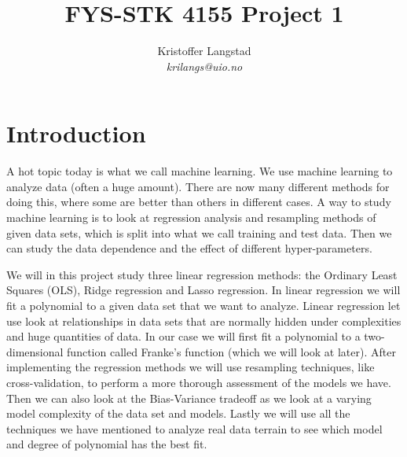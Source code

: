 \documentclass[12pt,a4paper,english]{article}
\title{FYS-STK 4155 Project 1}
\date{}
\author{ Kristoffer Langstad\\ \textit{krilangs@uio.no}}
\begin{document}
\maketitle
\begin{abstract}
	
\end{abstract}

\section{Introduction}
A hot topic today is what we call machine learning. We use machine learning to analyze data (often a huge amount). There are now many different methods for doing this, where some are better than others in different cases. A way to study machine learning is to look at regression analysis and resampling methods of given data sets, which is split into what we call training and test data. Then we can study the data dependence and the effect of different hyper-parameters.

We will in this project study three linear regression methods: the Ordinary Least Squares (OLS), Ridge regression and Lasso regression. In linear regression we will fit a polynomial to a given data set that we want to analyze. Linear regression let use look at relationships in data sets that are normally hidden under complexities and huge quantities of data. In our case we will first fit a polynomial to a two-dimensional function called Franke's function (which we will look at later). After implementing the regression methods we will use resampling techniques, like cross-validation, to perform a more thorough assessment of the models we have. Then we can also look at the Bias-Variance tradeoff as we look at a varying model complexity of the data set and models. Lastly we will use all the techniques we have mentioned to analyze real data terrain to see which model and degree of polynomial has the best fit.
\end{document}
